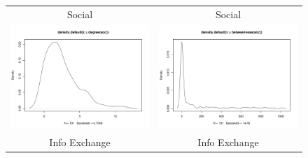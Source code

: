 \documentclass[fleqn,12pt]{wlscirep}
\begin{document}
\begin{figure}
\begin{longtable}[!h]{cc}
Social & Social\\
\includegraphics[height=.2\textheight, clip=true, trim=1cm 1cm 0cm 2cm]{figures/deg_soc.pdf}  &
\includegraphics[height=.2\textheight, clip=true, trim=1cm 1cm 0cm 2cm]{figures/cen_soc.pdf}\\

Info Exchange & Info Exchange\\


\end{longtable}
\end{figure}
\end{document}
